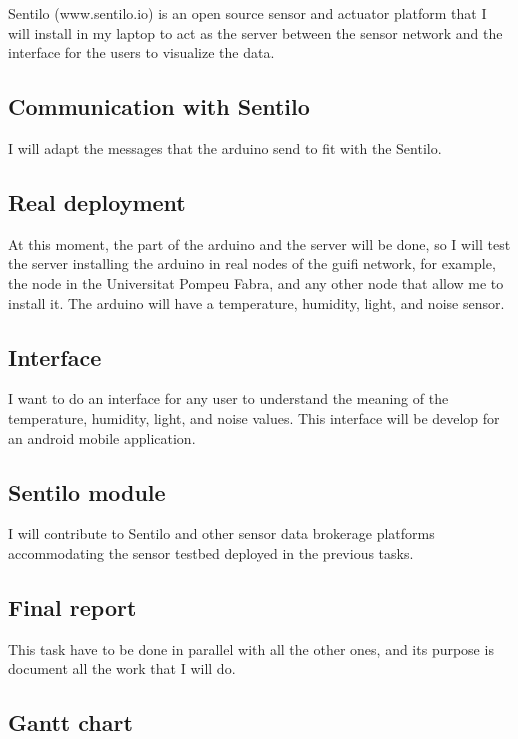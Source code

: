 \documentclass[10pt,a4paper]{article}
\begin{document}
Sentilo (www.sentilo.io) is an open source sensor and actuator platform that I will install in my laptop to act as the server between the sensor network and the interface for the users to visualize the data. 

\subsection{Communication with Sentilo}

I will adapt the messages that the arduino send to fit with the Sentilo.

\subsection{Real deployment}

At this moment, the part of the arduino and the server will be done, so I will test the server installing the arduino in real nodes of the guifi network, for example, the node in the Universitat Pompeu Fabra, and any other node that allow me to install it. The arduino will have a temperature, humidity, light, and noise sensor.

\subsection{Interface}

I want to do an interface for any user to understand the meaning of the temperature, humidity, light, and noise values. This interface will be develop for an android mobile application.

\subsection{Sentilo module}

I will contribute to Sentilo and other sensor data brokerage platforms accommodating the sensor testbed deployed in the previous tasks.

\subsection{Final report}

This task have to be done in parallel with all the other ones, and its purpose is document all the work that I will do.

\subsection{Gantt chart}
\end{document}
